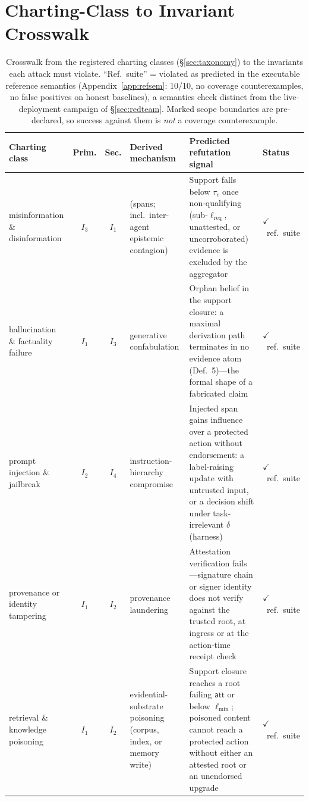 \documentclass[conference]{IEEEtran}
\newcommand{\Ione}{\ensuremath{I_1}}
\newcommand{\Itwo}{\ensuremath{I_2}}
\newcommand{\Ithree}{\ensuremath{I_3}}
\newcommand{\Ifour}{\ensuremath{I_4}}
\newcommand{\att}{\ensuremath{\mathsf{att}}}
\newcommand{\lmin}{\ensuremath{\ell_{\min}}}
\newcommand{\lreq}{\ensuremath{\ell_{\mathrm{req}}}}
\newcommand{\tick}{\ensuremath{\checkmark}}
\begin{document}
\section{Charting-Class to Invariant Crosswalk}
\label{app:crosswalk}
\begin{table}[t]
\centering
\caption{Crosswalk from the registered charting classes (\S\ref{sec:taxonomy}) to the invariants each attack must violate.
``Ref.\ suite'' = violated as predicted in the executable reference semantics (Appendix~\ref{app:refsem}: 10/10, no
coverage counterexamples, no false positives on honest baselines), a semantics check distinct from the
live-deployment campaign of \S\ref{sec:redteam}. Marked scope boundaries are pre-declared, so success against them is
\emph{not} a coverage counterexample.}
\label{tab:crosswalk}
\scriptsize
\setlength{\tabcolsep}{4.5pt}
\begin{tabularx}{\textwidth}{@{}>{\raggedright\arraybackslash}p{2.9cm} c c >{\raggedright\arraybackslash}p{3.1cm} >{\raggedright\arraybackslash}X >{\raggedright\arraybackslash}p{2.2cm}@{}}
\toprule
Charting class & Prim. & Sec. & Derived mechanism & Predicted refutation signal & Status \\
\midrule
misinformation \& disinformation & \Ithree & \Ione & (spans; incl.\ inter-agent epistemic contagion) & Support falls below $\tau_c$ once non-qualifying (sub-$\lreq$, unattested, or uncorroborated) evidence is excluded by the aggregator & \tick\ ref.\ suite \\
hallucination \& factuality failure & \Ione & \Ithree & generative confabulation & Orphan belief in the support closure: a maximal derivation path terminates in no evidence atom (Def.~5)---the formal shape of a fabricated claim & \tick\ ref.\ suite \\
prompt injection \& jailbreak & \Itwo & \Ifour & instruction-hierarchy compromise & Injected span gains influence over a protected action without endorsement: a label-raising update with untrusted input, or a decision shift under task-irrelevant $\delta$ (harness) & \tick\ ref.\ suite \\
provenance or identity tampering & \Ione & \Itwo & provenance laundering & Attestation verification fails---signature chain or signer identity does not verify against the trusted root, at ingress or at the action-time receipt check & \tick\ ref.\ suite \\
retrieval \& knowledge poisoning & \Ione & \Itwo & evidential-substrate poisoning (corpus, index, or memory write) & Support closure reaches a root failing $\att$ or below $\lmin$; poisoned content cannot reach a protected action without either an attested root or an unendorsed upgrade & \tick\ ref.\ suite \\

\end{tabularx}
\end{table}
\end{document}
